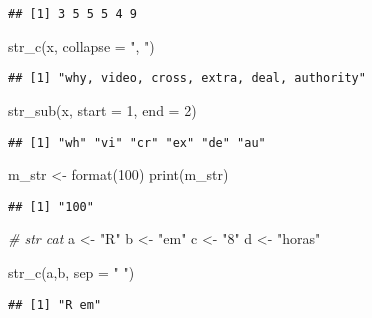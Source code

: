 \documentclass[
]{article}
\newenvironment{Shaded}{\begin{snugshade}}{\end{snugshade}}
\newcommand{\AttributeTok}[1]{\textcolor[rgb]{0.77,0.63,0.00}{#1}}
\newcommand{\CommentTok}[1]{\textcolor[rgb]{0.56,0.35,0.01}{\textit{#1}}}
\newcommand{\DecValTok}[1]{\textcolor[rgb]{0.00,0.00,0.81}{#1}}
\newcommand{\FunctionTok}[1]{\textcolor[rgb]{0.00,0.00,0.00}{#1}}
\newcommand{\NormalTok}[1]{#1}
\newcommand{\OtherTok}[1]{\textcolor[rgb]{0.56,0.35,0.01}{#1}}
\newcommand{\StringTok}[1]{\textcolor[rgb]{0.31,0.60,0.02}{#1}}
\begin{document}
\begin{verbatim}
## [1] 3 5 5 5 4 9
\end{verbatim}

\begin{Shaded}
\begin{Highlighting}[]
\FunctionTok{str\_c}\NormalTok{(x, }\AttributeTok{collapse =} \StringTok{", "}\NormalTok{)}
\end{Highlighting}
\end{Shaded}

\begin{verbatim}
## [1] "why, video, cross, extra, deal, authority"
\end{verbatim}

\begin{Shaded}
\begin{Highlighting}[]
\FunctionTok{str\_sub}\NormalTok{(x, }\AttributeTok{start =} \DecValTok{1}\NormalTok{, }\AttributeTok{end =} \DecValTok{2}\NormalTok{)}
\end{Highlighting}
\end{Shaded}

\begin{verbatim}
## [1] "wh" "vi" "cr" "ex" "de" "au"
\end{verbatim}

\begin{Shaded}
\begin{Highlighting}[]
\NormalTok{m\_str }\OtherTok{\textless{}{-}} \FunctionTok{format}\NormalTok{(}\DecValTok{100}\NormalTok{)}
\FunctionTok{print}\NormalTok{(m\_str)}
\end{Highlighting}
\end{Shaded}

\begin{verbatim}
## [1] "100"
\end{verbatim}

\begin{Shaded}
\begin{Highlighting}[]
\CommentTok{\# str cat}
\NormalTok{a }\OtherTok{\textless{}{-}} \StringTok{"R"}
\NormalTok{b }\OtherTok{\textless{}{-}} \StringTok{"em"}
\NormalTok{c }\OtherTok{\textless{}{-}} \StringTok{"8"}
\NormalTok{d }\OtherTok{\textless{}{-}} \StringTok{"horas"}

\FunctionTok{str\_c}\NormalTok{(a,b, }\AttributeTok{sep =} \StringTok{" "}\NormalTok{)}
\end{Highlighting}
\end{Shaded}

\begin{verbatim}
## [1] "R em"
\end{verbatim}
\end{document}
